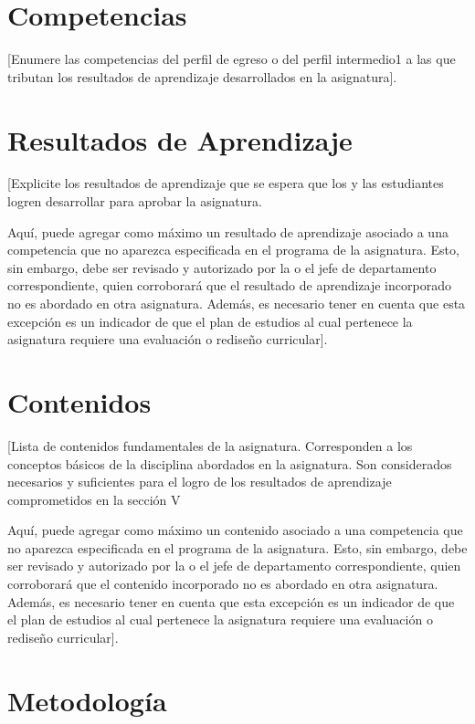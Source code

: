 \documentclass[11pt]{article}
\begin{document}
\section{Competencias}
\label{sec:org045ea64}
[Enumere las competencias del perfil de egreso o del perfil intermedio1 a las que tributan los resultados de aprendizaje desarrollados en la asignatura].

\section{Resultados de Aprendizaje}
\label{sec:org5a62056}
[Explicite los resultados de aprendizaje que se espera que los y las estudiantes logren desarrollar para aprobar la asignatura.

Aquí, puede agregar como máximo un resultado de aprendizaje asociado a una competencia que no aparezca especificada en el programa de la asignatura. Esto, sin embargo, debe ser revisado y autorizado por la o el jefe de departamento correspondiente, quien corroborará que el resultado de aprendizaje incorporado no es abordado en otra asignatura. Además, es necesario tener en cuenta que esta excepción es un indicador de que el plan de estudios al cual pertenece la asignatura requiere una evaluación o rediseño curricular].

\section{Contenidos}
\label{sec:org3918249}
[Lista de contenidos fundamentales de la asignatura. Corresponden a los conceptos básicos de la disciplina abordados en la asignatura. Son considerados necesarios y suficientes para el logro de los resultados de aprendizaje comprometidos en la sección V

Aquí, puede agregar como máximo un contenido asociado a una competencia que no aparezca especificada en el programa de la asignatura. Esto, sin embargo, debe ser revisado y autorizado por la o el jefe de departamento correspondiente, quien corroborará que el contenido incorporado no es abordado en otra asignatura. Además, es necesario tener en cuenta que esta excepción es un indicador de que el plan de estudios al cual pertenece la asignatura requiere una evaluación o rediseño curricular].

\section{Metodología}
\label{sec:org99ee960}
\end{document}
